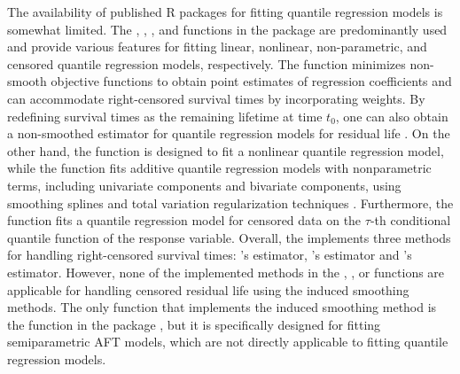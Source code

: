 The availability of published R packages for fitting quantile regression models is somewhat limited. 
The , , , and  functions in the package  
\citep{quantregpackage} are predominantly used and provide various features for fitting linear, 
nonlinear, non-parametric, and censored quantile regression models, respectively.
The  function minimizes non-smooth objective functions to obtain point estimates of regression coefficients 
and can accommodate right-censored survival times by incorporating weights.
By redefining survival times as the remaining lifetime at time $t_0$, 
one can also obtain a non-smoothed estimator for quantile regression models for residual life \citep{kim2012censored}.
On the other hand, the  function is designed to fit a nonlinear quantile regression model, while
the  function fits additive quantile regression models with 
nonparametric terms, including univariate components and bivariate components, 
using smoothing splines and total variation regularization techniques \citep{koenker1994quantile, koenker2004penalized}.
Furthermore, the  function fits a quantile regression model for censored data on the $\tau$-th 
conditional quantile function of the response variable.
Overall, the  implements three methods for handling right-censored survival times: \citet{powell1986censored}'s estimator,
\citet{portnoy2003censored}'s estimator and \citet{peng2008survival}'s estimator. 
However, none of the implemented methods in the , , or  functions 
are applicable for handling censored residual life using the induced smoothing methods. 
The only function that implements the induced smoothing method is the  function in the package 
 \citep{aftgeepackage}, 
but it is specifically designed for fitting semiparametric AFT models, which are not directly applicable 
to fitting quantile regression models.



